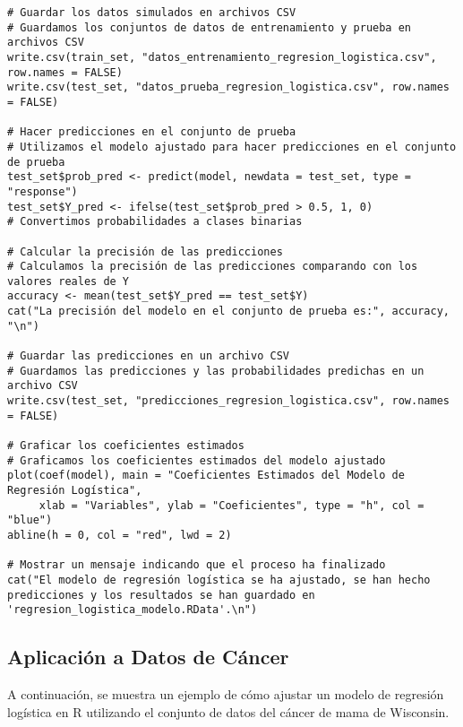 \begin{verbatim}
# Guardar los datos simulados en archivos CSV
# Guardamos los conjuntos de datos de entrenamiento y prueba en archivos CSV
write.csv(train_set, "datos_entrenamiento_regresion_logistica.csv", row.names = FALSE)
write.csv(test_set, "datos_prueba_regresion_logistica.csv", row.names = FALSE)

# Hacer predicciones en el conjunto de prueba
# Utilizamos el modelo ajustado para hacer predicciones en el conjunto de prueba
test_set$prob_pred <- predict(model, newdata = test_set, type = "response")
test_set$Y_pred <- ifelse(test_set$prob_pred > 0.5, 1, 0)  
# Convertimos probabilidades a clases binarias

# Calcular la precisión de las predicciones
# Calculamos la precisión de las predicciones comparando con los valores reales de Y
accuracy <- mean(test_set$Y_pred == test_set$Y)
cat("La precisión del modelo en el conjunto de prueba es:", accuracy, "\n")

# Guardar las predicciones en un archivo CSV
# Guardamos las predicciones y las probabilidades predichas en un archivo CSV
write.csv(test_set, "predicciones_regresion_logistica.csv", row.names = FALSE)

# Graficar los coeficientes estimados
# Graficamos los coeficientes estimados del modelo ajustado
plot(coef(model), main = "Coeficientes Estimados del Modelo de Regresión Logística", 
     xlab = "Variables", ylab = "Coeficientes", type = "h", col = "blue")
abline(h = 0, col = "red", lwd = 2)

# Mostrar un mensaje indicando que el proceso ha finalizado
cat("El modelo de regresión logística se ha ajustado, se han hecho predicciones y los resultados se han guardado en 'regresion_logistica_modelo.RData'.\n")
\end{verbatim}

\subsection{Aplicación a Datos de Cáncer}

A continuación, se muestra un ejemplo de cómo ajustar un modelo de regresión logística en R utilizando el conjunto de datos del cáncer de mama de Wisconsin.


